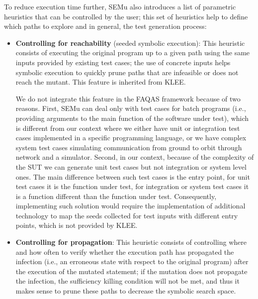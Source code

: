 To reduce execution time further, SEMu also introduces a list of parametric heuristics that can be controlled by the user; this set of heuristics help to define which paths to explore and in general, the test generation process:


\begin{itemize}
	\item \textbf{Controlling for reachability} (seeded symbolic execution): This heuristic consists of executing the original program up to a given path using the same inputs provided by existing test cases; the use of concrete inputs helps symbolic execution to quickly prune paths that are infeasible or does not reach the mutant. This feature is inherited from KLEE.
	
	
	
	We do not integrate this feature in the FAQAS framework because of two reasons. 
	First, SEMu can deal only with test cases for batch programs (i.e., providing arguments to the main function of the software under test), which is different from our context where we either have unit or integration test cases implemented in a specific programming language, or we have complex system test cases simulating communication from ground to orbit through network and a simulator. 
	Second, in our context, because of the complexity of the SUT we can generate unit test cases but not integration or system level ones. The main difference between such test cases is the entry point, for unit test cases it is the function under test, for integration or system test cases it is a function different than the function under test. Consequently, implementing such solution would require the implementation of additional technology to map the seeds collected for test inputs with different entry points, which is not provided by KLEE.

	\item \textbf{Controlling for propagation}: This heuristic consists of controlling where and how often to verify whether the execution path has propagated the infection (i.e., an erroneous state with respect to the original program) after the execution of the mutated statement; if the mutation does not propagate the infection, the sufficiency killing condition will not be met, and thus it makes sense to prune these paths to decrease the symbolic search space.


\end{itemize}
